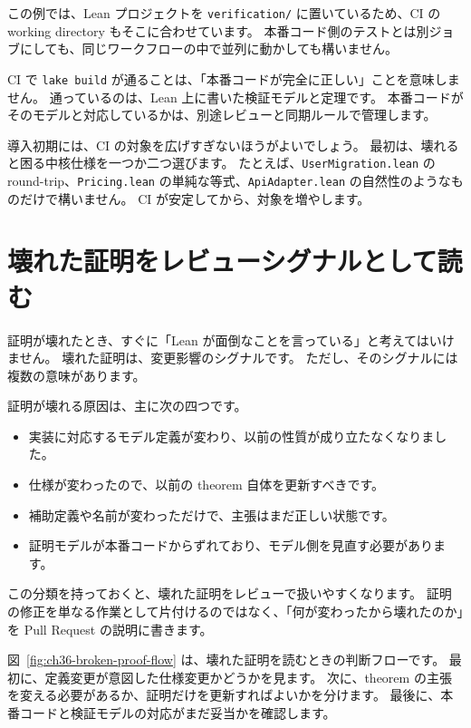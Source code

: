 この例では、Lean プロジェクトを \texttt{verification/} に置いているため、CI の working directory もそこに合わせています。
本番コード側のテストとは別ジョブにしても、同じワークフローの中で並列に動かしても構いません。

CI で \texttt{lake build} が通ることは、「本番コードが完全に正しい」ことを意味しません。
通っているのは、Lean 上に書いた検証モデルと定理です。
本番コードがそのモデルと対応しているかは、別途レビューと同期ルールで管理します。

導入初期には、CI の対象を広げすぎないほうがよいでしょう。
最初は、壊れると困る中核仕様を一つか二つ選びます。
たとえば、\texttt{UserMigration.lean} の round-trip、\texttt{Pricing.lean} の単純な等式、\texttt{ApiAdapter.lean} の自然性のようなものだけで構いません。
CI が安定してから、対象を増やします。

\section{壊れた証明をレビューシグナルとして読む}

証明が壊れたとき、すぐに「Lean が面倒なことを言っている」と考えてはいけません。
壊れた証明は、変更影響のシグナルです。
ただし、そのシグナルには複数の意味があります。

証明が壊れる原因は、主に次の四つです。

\begin{itemize}
\item 実装に対応するモデル定義が変わり、以前の性質が成り立たなくなりました。
\item 仕様が変わったので、以前の theorem 自体を更新すべきです。
\item 補助定義や名前が変わっただけで、主張はまだ正しい状態です。
\item 証明モデルが本番コードからずれており、モデル側を見直す必要があります。
\end{itemize}

この分類を持っておくと、壊れた証明をレビューで扱いやすくなります。
証明の修正を単なる作業として片付けるのではなく、「何が変わったから壊れたのか」を Pull Request の説明に書きます。


図~\ref{fig:ch36-broken-proof-flow} は、壊れた証明を読むときの判断フローです。
最初に、定義変更が意図した仕様変更かどうかを見ます。
次に、theorem の主張を変える必要があるか、証明だけを更新すればよいかを分けます。
最後に、本番コードと検証モデルの対応がまだ妥当かを確認します。

